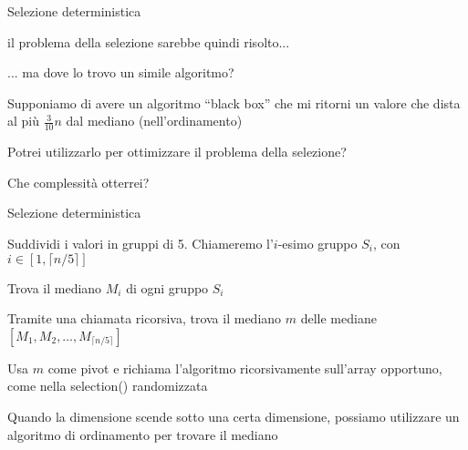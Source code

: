 \begin{frame}{Selezione deterministica}

\vspace{-9pt}
\begin{myboxtitle}
\BIL
\item il problema della selezione sarebbe quindi risolto...
\item ... ma dove lo trovo un simile algoritmo?
\EIL
\end{myboxtitle}

\begin{myboxtitle}
\BIL
\item Supponiamo di avere un algoritmo “black box” che mi ritorni un valore che dista al più $\frac{3}{10}n$ dal mediano (nell'ordinamento)
\item Potrei utilizzarlo per ottimizzare il problema della selezione?
\item Che complessità otterrei?
\EIL
\end{myboxtitle}

\end{frame}

\begin{frame}{Selezione deterministica}

\vspace{-9pt}
\begin{myboxtitle}[Idea]
\BIL
\item Suddividi i valori in gruppi di 5. Chiameremo l'$i$-esimo gruppo $S_i$, con $i \in \left[1, \lceil n/5 \rceil \right]$
\item Trova il mediano $M_i$ di ogni gruppo $S_i$
\item Tramite una chiamata ricorsiva, trova il mediano $m$ delle mediane
$[M_1, M_2, \ldots, M_{\lceil n/5 \rceil}]$
\item Usa $m$ come pivot e richiama l'algoritmo ricorsivamente sull'array opportuno, come nella \textsf{selection}() randomizzata
\item Quando la dimensione scende sotto una certa dimensione, possiamo
utilizzare un algoritmo di ordinamento per trovare il mediano
\EIL
\end{myboxtitle}

\end{frame}

